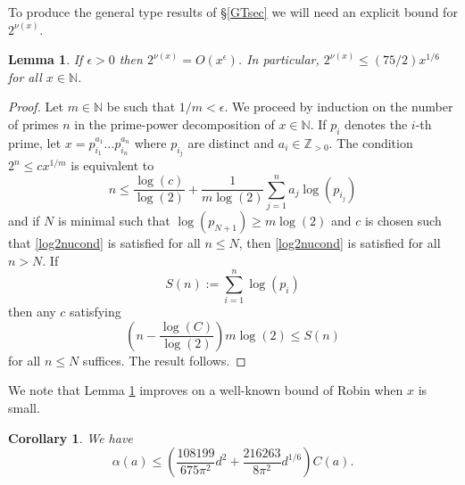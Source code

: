 \documentclass[12pt, a4paper]{article}
\newtheorem{cor}{Corollary}[section]
\newtheorem{lemma}[thm]{Lemma}
\newcommand{\ZZ}{\mathbb{Z}}
\newcommand{\NN}{\mathbb{N}}
\newcommand{\opn}{\operatorname}
\begin{document}
To produce the general type results of \S\ref{GTsec} we will need an explicit bound for $2^{\nu(x)}$.
\begin{lemma}\label{2nulemma}
  If $\epsilon>0$ then $2^{\nu(x)} = O(x^{\epsilon})$.
  In particular, $2^{\nu(x)} \leq (75/2)x^{1/6}$ for all $x \in \NN$.
\end{lemma}
\begin{proof}
  Let $m \in \NN$ be such that $1/m<\epsilon$.
  We proceed by induction on the number of primes $n$ in the prime-power decomposition of $x \in \NN$.
  If $p_i$ denotes the $i$-th prime, let $x=p_{i_1}^{a_1} \ldots p_{i_n}^{a_n}$ where $p_{i_j}$ are distinct and $a_i \in \ZZ_{>0}$.
  The condition 
$2^n \leq c x^{1/m}$ 
is equivalent to
  \begin{equation}\label{log2nucond}
    n \leq \frac{\opn{log}(c)}{\opn{log}(2)} + \frac{1}{m \opn{log}(2)} \sum_{j=1}^n a_j \opn{log}(p_{i_j})
  \end{equation}
  and if $N$ is minimal such that $\opn{log}(p_{N+1}) \geq m \opn{log}(2)$ and $c$ is chosen such that \eqref{log2nucond} is satisfied for all $n \leq N$, then \eqref{log2nucond} is satisfied for all $n > N$.
  If
  \[
  S(n):=\sum_{i=1}^n \opn{log}(p_i)
  \]
  then any $c$ satisfying 
  \[
  \left ( n - \frac{\opn{log}(C)}{\opn{log}(2)} \right )m \opn{log}(2) \leq S(n)
  \]
  for all $n \leq N$ suffices.
  The result follows.
\end{proof}
We note that Lemma \ref{2nulemma} improves on a well-known bound of Robin \cite{Robin} when $x$ is small.
\begin{cor}\label{alphacor}
  We have
  \[
  \alpha(a) \leq \left (
  \frac{108199}{675 \pi^2} d^2 + \frac{216263}{8 \pi^2} d^{1/6}
  \right ) C(a).
  \]
\end{cor}
\end{document}
